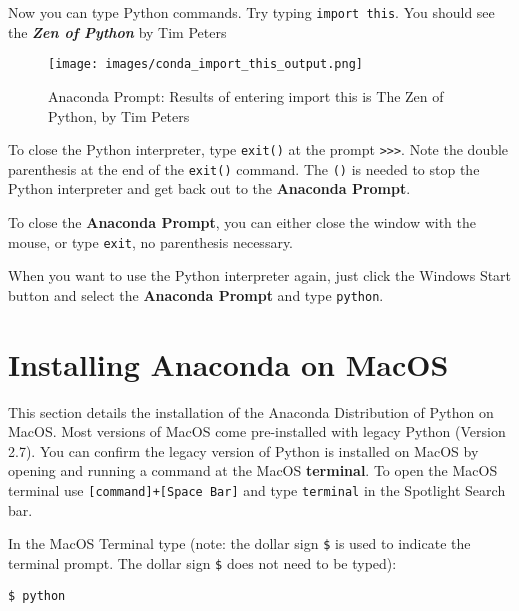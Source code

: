 \documentclass{book}
\makeatletter
\def\maxwidth{\ifdim\Gin@nat@width>\linewidth\linewidth
\else\Gin@nat@width\fi}
\let\Oldincludegraphics\includegraphics
\renewcommand{\includegraphics}[1]{\Oldincludegraphics[width=.8\maxwidth]{#1}}
\newcommand{\passthrough}[1]{#1}
\makeatother
\begin{document}
Now you can type Python commands. Try typing
\passthrough{\lstinline!import this!}. You should see the
\textbf{\emph{Zen of Python}} by Tim Peters

\begin{figure}
\centering
\texttt{[image: images/conda\_import\_this\_output.png]}
\caption{Anaconda Prompt: Results of entering import this is The Zen of
Python, by Tim Peters}
\end{figure}

To close the Python interpreter, type \passthrough{\lstinline!exit()!}
at the prompt \passthrough{\lstinline!>>>!}. Note the double parenthesis
at the end of the \passthrough{\lstinline!exit()!} command. The
\passthrough{\lstinline!()!} is needed to stop the Python interpreter
and get back out to the \textbf{Anaconda Prompt}.

To close the \textbf{Anaconda Prompt}, you can either close the window
with the mouse, or type \passthrough{\lstinline!exit!}, no parenthesis
necessary.

When you want to use the Python interpreter again, just click the
Windows Start button and select the \textbf{Anaconda Prompt} and type
\passthrough{\lstinline!python!}.
    




    
        \hypertarget{installing-anaconda-on-macos}{%
\section{Installing Anaconda on
MacOS}\label{installing-anaconda-on-macos}}
    




    
        This section details the installation of the Anaconda Distribution of
Python on MacOS. Most versions of MacOS come pre-installed with legacy
Python (Version 2.7). You can confirm the legacy version of Python is
installed on MacOS by opening and running a command at the MacOS
\textbf{terminal}. To open the MacOS terminal use
\passthrough{\lstinline![command]+[Space Bar]!} and type
\passthrough{\lstinline!terminal!} in the Spotlight Search bar.

In the MacOS Terminal type (note: the dollar sign
\passthrough{\lstinline!$!} is used to indicate the terminal prompt. The
dollar sign \passthrough{\lstinline!$!} does not need to be typed):

\begin{lstlisting}
$ python
\end{lstlisting}
\end{document}
